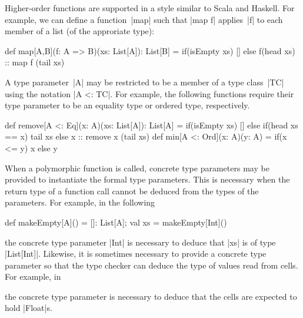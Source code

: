 Higher-order functions are supported in a style similar to Scala and Haskell. 
For example, we can define a function~|map| such that |map f| applies~|f| to
each member of a list (of the approriate type):
%
\begin{scala}
def map[A,B](f: A => B)(xs: List[A]): List[B] = 
  if(isEmpty xs) [] else f(head xs) :: map f (tail xs)
\end{scala}

A type parameter~|A| may be restricted to be a member of a type class~|TC|
using the notation |A <: TC|.  For example, the following functions require
their type parameter to be an equality type or ordered type, respectively.
%
\begin{scala}
def remove[A <: Eq](x: A)(xs: List[A]): List[A] =
  if(isEmpty xs) [] else if(head xs == x) tail xs else x :: remove x (tail xs)
def min[A <: Ord](x: A)(y: A) = if(x <= y) x else y
\end{scala}

When a polymorphic function is called, concrete type parameters may be
provided to instantiate the formal type parameters.  This is necessary when
the return type of a function call cannot be deduced from the types of the
parameters.  For example, in the following
\begin{scala}
def makeEmpty[A]() = []: List[A]; val xs = makeEmpty[Int]()
\end{scala}
the concrete type parameter |Int| is necessary to deduce that |xs| is of type
|List[Int]|.  Likewise, it is sometimes necessary to provide a concrete type
parameter so that the type checker can deduce the type of values read from
cells.  For example, in
the concrete type parameter is necessary to deduce that the cells are expected
to hold |Float|s. 


